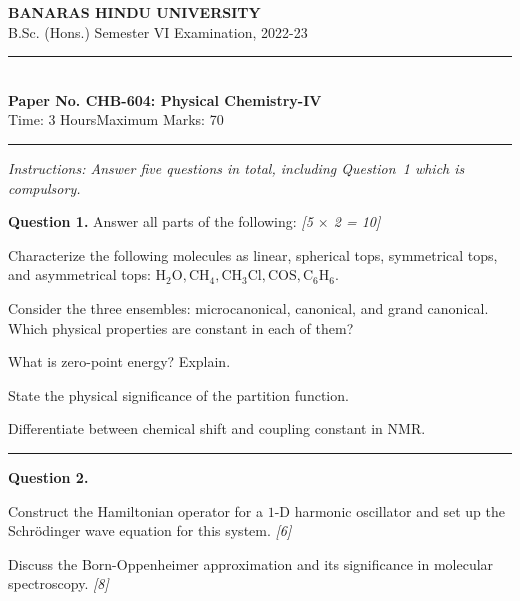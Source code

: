 \documentclass[11pt,a4paper]{article}
\newcommand{\pts}[1]{\hfill   \textit{[#1]}}
\begin{document}
\begin{center}
  {\large\bfseries BANARAS HINDU UNIVERSITY}\\[2pt]
  {\normalsize B.Sc. (Hons.) Semester VI Examination, 2022-23}\\[6pt]
  \rule{0.8\linewidth}{0.5pt}\\[6pt]
  {\large\bfseries Paper No. CHB-604: Physical Chemistry-IV}\\[4pt]
  {\normalsize Time: 3 Hours\hfill Maximum Marks: 70}
\end{center}
\rule{\linewidth}{0.4pt}
\small



\noindent   \textit{Instructions: Answer five questions in total, including Question~1 which is compulsory.}

\normalsize
\bigskip




\noindent   \textbf{Question 1.} Answer all parts of the following: \pts{5 $ \times$ 2 = 10}

\begin{parts}
  \item Characterize the following molecules as linear, spherical tops, symmetrical tops, and asymmetrical tops: $ \text{H}_2 \text{O},  \text{CH}_4,  \text{CH}_3 \text{Cl},  \text{COS},  \text{C}_6 \text{H}_6$.
  \item Consider the three ensembles: microcanonical, canonical, and grand canonical. Which physical properties are constant in each of them?
  \item What is zero-point energy? Explain.
  \item State the physical significance of the partition function.
  \item Differentiate between chemical shift and coupling constant in NMR.
\end{parts}

\medskip\rule{\linewidth}{0.2pt}




\noindent   \textbf{Question 2.}

\begin{parts}
  \item Construct the Hamiltonian operator for a $1$-D harmonic oscillator and set up the Schr\"odinger wave equation for this system. \pts{6}
  \item Discuss the Born-Oppenheimer approximation and its significance in molecular spectroscopy. \pts{8}
\end{parts}
\end{document}
